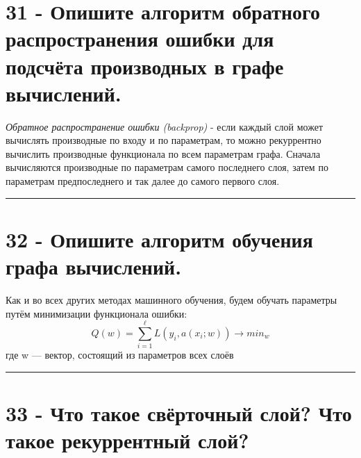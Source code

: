 \documentclass[11pt]{article}
\begin{document}
    \section{31 - Опишите алгоритм обратного распространения ошибки для
подсчёта производных в графе
вычислений.}\label{ux43eux43fux438ux448ux438ux442ux435-ux430ux43bux433ux43eux440ux438ux442ux43c-ux43eux431ux440ux430ux442ux43dux43eux433ux43e-ux440ux430ux441ux43fux440ux43eux441ux442ux440ux430ux43dux435ux43dux438ux44f-ux43eux448ux438ux431ux43aux438-ux434ux43bux44f-ux43fux43eux434ux441ux447ux451ux442ux430-ux43fux440ux43eux438ux437ux432ux43eux434ux43dux44bux445-ux432-ux433ux440ux430ux444ux435-ux432ux44bux447ux438ux441ux43bux435ux43dux438ux439.}

\emph{Обратное распространение ошибки (backprop)} - если каждый слой
может вычислять производные по входу и по параметрам, то можно
рекуррентно вычислить производные функционала по всем параметрам графа.
Сначала вычисляются производные по параметрам самого последнего слоя,
затем по параметрам предпоследнего и так далее до самого первого слоя.

    \begin{center}\rule{0.5\linewidth}{\linethickness}\end{center}

    \section{32 - Опишите алгоритм обучения графа
вычислений.}\label{ux43eux43fux438ux448ux438ux442ux435-ux430ux43bux433ux43eux440ux438ux442ux43c-ux43eux431ux443ux447ux435ux43dux438ux44f-ux433ux440ux430ux444ux430-ux432ux44bux447ux438ux441ux43bux435ux43dux438ux439.}

Как и во всех других методах машинного обучения, будем обучать параметры
путём минимизации функционала ошибки:
\[Q(w) = \sum_{i=1}^ℓL(y_i, a(x_i;w)) → min_w\] где w --- вектор,
состоящий из параметров всех слоёв

    \begin{center}\rule{0.5\linewidth}{\linethickness}\end{center}

    \section{33 - Что такое свёрточный слой? Что такое рекуррентный
слой?}\label{ux447ux442ux43e-ux442ux430ux43aux43eux435-ux441ux432ux451ux440ux442ux43eux447ux43dux44bux439-ux441ux43bux43eux439-ux447ux442ux43e-ux442ux430ux43aux43eux435-ux440ux435ux43aux443ux440ux440ux435ux43dux442ux43dux44bux439-ux441ux43bux43eux439}
\end{document}
